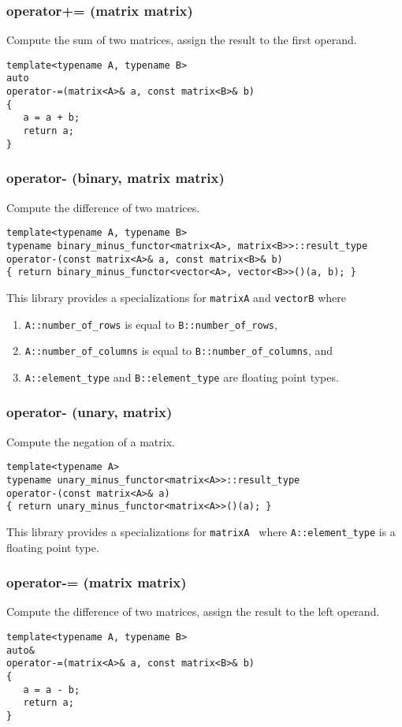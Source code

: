 \documentclass[oneside]{book}
\begin{document}
\subsubsection{operator+= (matrix matrix)}
Compute the sum of two matrices, assign the result to the first operand.
\begin{verbatim}
template<typename A, typename B>
auto
operator-=(matrix<A>& a, const matrix<B>& b)
{
   a = a + b;
   return a;
}
\end{verbatim}
\subsubsection{operator- (binary, matrix matrix)}
Compute the difference of two matrices.
\begin{verbatim}
template<typename A, typename B>
typename binary_minus_functor<matrix<A>, matrix<B>>::result_type
operator-(const matrix<A>& a, const matrix<B>& b)
{ return binary_minus_functor<vector<A>, vector<B>>()(a, b); }
\end{verbatim}
This library provides a specializations for \texttt{matrix\textlangle A\textrangle}
and \texttt{vector\textlangle B\textrangle} where
\begin{enumerate}
	\item \texttt{A::number\_of\_rows} is equal to \texttt{B::number\_of\_rows},
	\item \texttt{A::number\_of\_columns} is equal to \texttt{B::number\_of\_columns}, and
	\item \texttt{A::element\_type} and \texttt{B::element\_type} are floating point types.
\end{enumerate}

\subsubsection{operator- (unary, matrix)}
Compute the negation of a matrix.
\begin{verbatim}
template<typename A>
typename unary_minus_functor<matrix<A>>::result_type
operator-(const matrix<A>& a)
{ return unary_minus_functor<matrix<A>>()(a); }
\end{verbatim}
This library provides a specializations for \texttt{matrix\textlangle A
\textrangle} where  \texttt{A::element\_type} is a floating point type.

\subsubsection{operator-= (matrix matrix)}
Compute the difference of two matrices, assign the result to the left operand.
\begin{verbatim}
template<typename A, typename B>
auto&
operator-=(matrix<A>& a, const matrix<B>& b)
{
   a = a - b;
   return a;
}
\end{verbatim}
\end{document}
